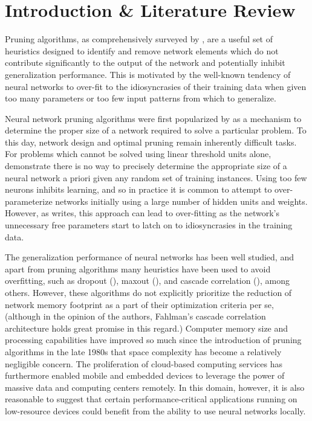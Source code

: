 \section{Introduction \& Literature Review}\label{sec1}
Pruning algorithms, as comprehensively surveyed by \cite{reed1993pruning}, are a useful set of heuristics designed to identify and remove network elements which do not contribute significantly to the output of the network and potentially inhibit generalization performance. This is motivated by the well-known tendency of neural networks to over-fit to the idiosyncrasies of their training data when given too many parameters or too few input patterns from which to generalize. 

Neural network pruning algorithms were first popularized by \cite{sietsma1988neural} as a mechanism to determine the proper size of a network required to solve a particular problem. To this day, network design and optimal pruning remain inherently difficult tasks. For problems which cannot be solved using linear threshold units alone, \cite{baum1989size} demonstrate there is no way to precisely determine the appropriate size of a neural network a priori given any random set of training instances. Using too few neurons inhibits learning, and so in practice it is common to attempt to over-parameterize networks initially using a large number of hidden units and weights. However, as \cite{chauvin1990generalization} writes, this approach can lead to over-fitting as the network's unnecessary free parameters start to latch on to idiosyncrasies in the training data. 




The generalization performance of neural networks has been well studied, and apart from pruning algorithms many heuristics have been used to avoid overfitting, such as dropout (\cite{srivastava2014dropout}), maxout (\cite{goodfellow2013maxout}), and cascade correlation (\cite{fahlman1989cascade}), among others. However, these algorithms do not explicitly prioritize the reduction of network memory footprint as a part of their optimization criteria per se, (although in the opinion of the authors, Fahlman's cascade correlation architecture holds great promise in this regard.) Computer memory size and processing capabilities have improved so much since the introduction of pruning algorithms in the late 1980s that space complexity has become a relatively negligible concern. The proliferation of cloud-based computing services has furthermore enabled mobile and embedded devices to leverage the power of massive data and computing centers remotely. In this domain, however, it is also reasonable to suggest that certain performance-critical applications running on low-resource devices could benefit from the ability to use neural networks locally. 


